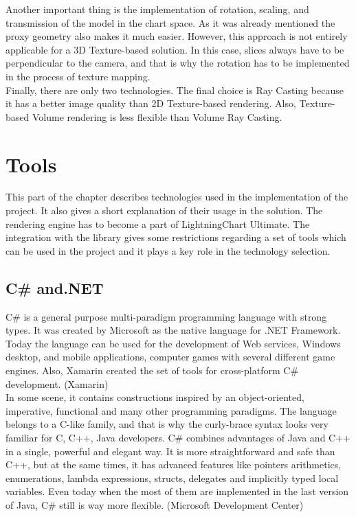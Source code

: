 \documentclass[twoside, english, 11pt]{report}
\begin{document}
Another important thing is the implementation of rotation, scaling, and transmission of the model in the chart space. As it was already mentioned the proxy geometry also makes it much easier. However, this approach is not entirely applicable for a 3D Texture-based solution. In this case, slices always have to be perpendicular to the camera, and that is why the rotation has to be implemented in the process of texture mapping.\\

Finally, there are only two technologies. The final choice is Ray Casting because it has a better image quality than 2D Texture-based rendering. Also, Texture-based Volume rendering is less flexible than Volume Ray Casting.
\section{Tools}
This part of the chapter describes technologies used in the implementation of the project. It also gives a short explanation of their usage in the solution. The rendering engine has to become a part of LightningChart Ultimate. The integration with the library gives some restrictions regarding a set of tools which can be used in the project and it plays a key role in the technology selection.
\subsection{C\# and.NET}
C\# is a general purpose multi-paradigm programming language with strong types. It was created by Microsoft as the native language for .NET Framework. Today the language can be used for the development of Web services, Windows desktop, and mobile applications, computer games with several different game engines. Also, Xamarin created the set of tools for cross-platform C\# development. (Xamarin)\\

In some scene, it contains constructions inspired by an object-oriented, imperative, functional and many other programming paradigms. The language belongs to a C-like family, and that is why the curly-brace syntax looks very familiar for C, C++, Java developers. C\# combines advantages of Java and C++ in a single, powerful and elegant way. It is more straightforward and safe than C++, but at the same times, it has advanced features like pointers arithmetics, enumerations, lambda expressions, structs, delegates and implicitly typed local variables. Even today when the most of them are implemented in the last version of Java, C\# still is way more flexible. (Microsoft Development Center)\\
\end{document}
